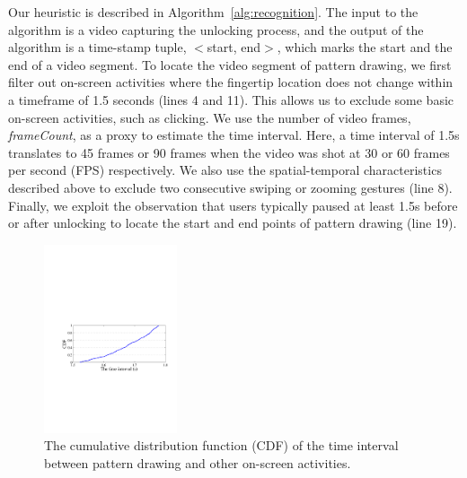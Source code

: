 Our heuristic is described
in Algorithm~\ref{alg:recognition}. The input to the algorithm is a video capturing the unlocking process, and the output of the
algorithm is a time-stamp tuple, $<$start, end$>$, which marks the start and the end
of a video segment.
To locate the video segment of pattern drawing, we first filter out on-screen activities where the
fingertip location does not change within a timeframe of 1.5 seconds (lines 4 and 11). This
allows us to exclude some basic on-screen activities, such as clicking. We
use the number of video frames, \emph{frameCount}, as a proxy to estimate the time interval. Here, a time
interval of 1.5s translates to 45 frames or 90 frames when the video was shot
at 30 or 60 frames per second (FPS) respectively. We also use the
spatial-temporal characteristics described above to exclude two consecutive swiping or zooming gestures (line 8). Finally, we exploit the observation that users
typically paused at least 1.5s before or after unlocking to locate the start
and end points of pattern drawing (line 19).

\begin{figure}[!t]
    \centering
    \includegraphics[width=0.35\textwidth]{fig/time-interval.pdf}
    \caption{The cumulative distribution function (CDF) of the time interval between pattern drawing and other on-screen activities.}
    \label{fig:time-interval}
\end{figure}

